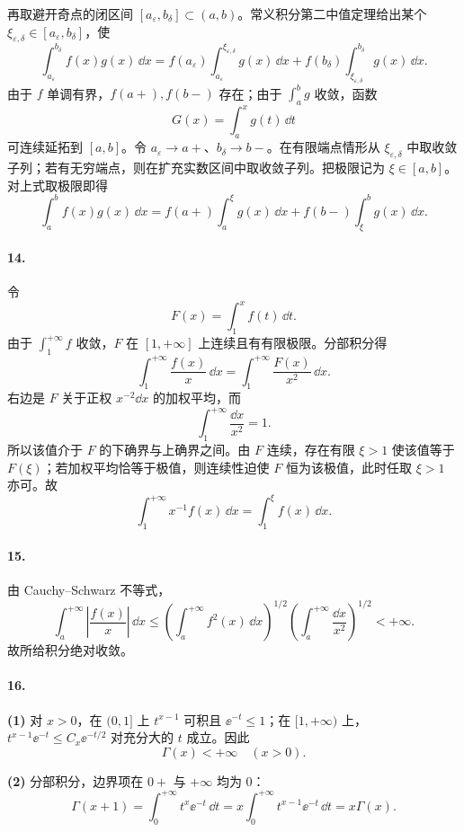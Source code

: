 再取避开奇点的闭区间 $[a_\varepsilon,b_\delta]\subset(a,b)$。常义积分第二中值定理给出某个 $\xi_{\varepsilon,\delta}\in[a_\varepsilon,b_\delta]$，使
\[
  \int_{a_\varepsilon}^{b_\delta}f(x)g(x)\,\dd x
  =f(a_\varepsilon)\int_{a_\varepsilon}^{\xi_{\varepsilon,\delta}}g(x)\,\dd x
  +f(b_\delta)\int_{\xi_{\varepsilon,\delta}}^{b_\delta}g(x)\,\dd x.
\]
由于 $f$ 单调有界，$f(a+),f(b-)$ 存在；由于 $\int_a^b g$ 收敛，函数
\[
  G(x)=\int_a^xg(t)\,\dd t
\]
可连续延拓到 $[a,b]$。令 $a_\varepsilon\to a+$、$b_\delta\to b-$。在有限端点情形从 $\xi_{\varepsilon,\delta}$ 中取收敛子列；若有无穷端点，则在扩充实数区间中取收敛子列。把极限记为 $\xi\in[a,b]$。对上式取极限即得
\[
  \boxed{\int_a^b f(x)g(x)\,\dd x
  =f(a+)\int_a^\xi g(x)\,\dd x
  +f(b-)\int_\xi^b g(x)\,\dd x}.
\]

\paragraph{14.}
令
\[
  F(x)=\int_1^x f(t)\,\dd t.
\]
由于 $\int_1^{+\infty}f$ 收敛，$F$ 在 $[1,+\infty]$ 上连续且有有限极限。分部积分得
\[
  \int_1^{+\infty}\frac{f(x)}x\,\dd x
  =\int_1^{+\infty}\frac{F(x)}{x^2}\,\dd x.
\]
右边是 $F$ 关于正权 $x^{-2}\dd x$ 的加权平均，而
\[
  \int_1^{+\infty}\frac{\dd x}{x^2}=1.
\]
所以该值介于 $F$ 的下确界与上确界之间。由 $F$ 连续，存在有限 $\xi>1$ 使该值等于 $F(\xi)$；若加权平均恰等于极值，则连续性迫使 $F$ 恒为该极值，此时任取 $\xi>1$ 亦可。故
\[
  \boxed{\int_1^{+\infty}x^{-1}f(x)\,\dd x=\int_1^\xi f(x)\,\dd x}.
\]

\paragraph{15.}
由 Cauchy--Schwarz 不等式，
\[
  \int_a^{+\infty}\left|\frac{f(x)}x\right|\,\dd x
  \leq\left(\int_a^{+\infty}f^2(x)\,\dd x\right)^{1/2}
      \left(\int_a^{+\infty}\frac{\dd x}{x^2}\right)^{1/2}<+\infty.
\]
故所给积分绝对收敛。

\paragraph{16.}
\textbf{(1)} 对 $x>0$，在 $(0,1]$ 上 $t^{x-1}$ 可积且 $\ee^{-t}\leq1$；在 $[1,+\infty)$ 上，$t^{x-1}\ee^{-t}\leq C_x\ee^{-t/2}$ 对充分大的 $t$ 成立。因此
\[
  \boxed{\Gamma(x)<+\infty\quad(x>0)}.
\]

\textbf{(2)} 分部积分，边界项在 $0+$ 与 $+\infty$ 均为 $0$：
\[
  \Gamma(x+1)=\int_0^{+\infty}t^x\ee^{-t}\,\dd t
  =x\int_0^{+\infty}t^{x-1}\ee^{-t}\,\dd t
  =\boxed{x\Gamma(x)}.
\]

